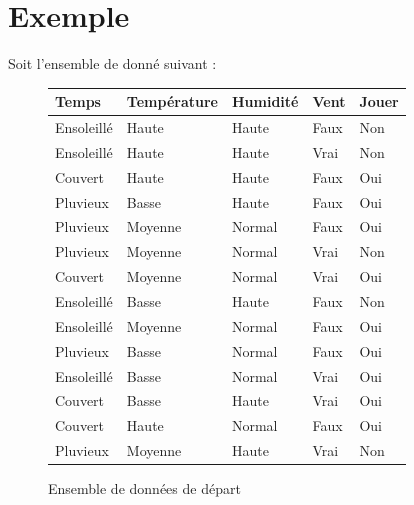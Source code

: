 \documentclass[a4paper, 11pt]{report}
\begin{document}
\section{Exemple}
Soit l'ensemble de donné suivant :\\

\begin{figure}[!h]
\begin{center}

\caption{Ensemble de données de départ}
\begin{tabular}{| l | l | l | l | l |}
\hline
\rowcolor{gray!25}
Temps & Température & Humidité & Vent & Jouer \\
\hline
Ensoleillé & Haute & Haute & Faux & \cellcolor{green}Non \\
\hline
Ensoleillé & Haute & Haute & Vrai & \cellcolor{green}Non \\
\hline
Couvert & Haute & Haute & Faux & \cellcolor{yellow}Oui \\
\hline
Pluvieux & Basse & Haute & Faux & \cellcolor{yellow}Oui \\
\hline
Pluvieux & Moyenne & Normal & Faux & \cellcolor{yellow}Oui \\
\hline
Pluvieux & Moyenne & Normal & Vrai &  \cellcolor{green}Non \\
\hline
Couvert & Moyenne & Normal & Vrai &  \cellcolor{yellow}Oui \\
\hline
Ensoleillé & Basse & Haute & Faux &  \cellcolor{green}Non \\
\hline
Ensoleillé & Moyenne & Normal & Faux &  \cellcolor{yellow}Oui \\
\hline
Pluvieux & Basse & Normal & Faux &  \cellcolor{yellow}Oui \\
\hline
Ensoleillé & Basse & Normal & Vrai &  \cellcolor{yellow}Oui \\
\hline
Couvert & Basse & Haute & Vrai &  \cellcolor{yellow}Oui \\
\hline
Couvert & Haute & Normal & Faux &  \cellcolor{yellow}Oui \\
\hline
Pluvieux & Moyenne & Haute & Vrai &  \cellcolor{green}Non \\
\hline
\end{tabular}
\end{center}

\end{figure}
\end{document}
